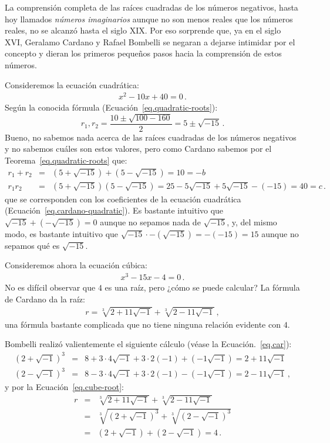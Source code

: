 La comprensión completa de las raíces cuadradas de los números negativos, hasta hoy llamados \emph{números imaginarios} aunque no son menos reales que los números reales, no se alcanzó hasta el siglo XIX. Por eso sorprende que, ya en el siglo XVI, Geralamo Cardano y Rafael Bombelli se negaran a dejarse intimidar por el concepto y dieran los primeros pequeños pasos hacia la comprensión de estos números.

Consideremos la ecuación cuadrática:
\begin{align}
x^2-10x+40=0\,.\label{eq.cardano-quadratic}
\end{align}
Según la conocida fórmula (Ecuación~\ref{eq.quadratic-roots}):
\[
r_1, r_2=\displaystyle\frac{10\pm\sqrt{100-160}}{2}=5\pm\sqrt{-15}\,.
\]
Bueno, no sabemos nada acerca de las raíces cuadradas de los números negativos y no sabemos cuáles son estos valores, pero como Cardano sabemos por el Teorema~\ref{eq.quadratic-roots} que:
\[
\begin{array}{lcl}
r_1+r_2&=&(5+\sqrt{-15})+(5-\sqrt{-15})=10=-b\\
r_1r_2&=&(5+\sqrt{-15})(5-\sqrt{-15})=25-5\sqrt{-15}+5\sqrt{-15}-(-15)=40=c\,.
\end{array}
\]
que se corresponden con los coeficientes de la ecuación cuadrática (Ecuación~\ref{eq.cardano-quadratic}). Es bastante intuitivo que $\sqrt{-15}+(-\sqrt{-15})=0$ aunque no sepamos nada de $\sqrt{-15}$, y, del mismo modo, es bastante intuitivo que $\sqrt{-15}\cdot-(\sqrt{-15})=-(-15)=15$ aunque no sepamos qué es $\sqrt{-15}$.

Consideremos ahora la ecuación cúbica:
\begin{align}
x^3-15x-4=0\,.\label{eq.bombelli-cubic}
\end{align}
No es difícil observar que $4$ es una raíz, pero ¿cómo se puede calcular? La fórmula de Cardano da la raíz:
\begin{align}
r=\sqrt[3]{2+11\sqrt{-1}}+\sqrt[3]{2-11\sqrt{-1}}\,,\label{eq.cube-root}
\end{align}
una fórmula bastante complicada que no tiene ninguna relación evidente con $4$. 

Bombelli realizó valientemente el siguiente cálculo (véase la Ecuación.~\ref{eq.car}):
\begin{eqnarray*}
(2+\sqrt{-1})^3&=&
8+3\cdot 4\sqrt{-1}+3\cdot 2(-1)+(-1\sqrt{-1})=
2+11\sqrt{-1}\\
(2-\sqrt{-1})^3&=&
8-3\cdot 4\sqrt{-1}+3\cdot 2(-1)-(-1\sqrt{-1})=
2-11\sqrt{-1}\,,
\end{eqnarray*}
y por la Ecuación~\ref{eq.cube-root}:
\begin{eqnarray*}
r&=&\sqrt[3]{2+11\sqrt{-1}} + \sqrt[3]{2-11\sqrt{-1}}\\
&=&\sqrt[3]{(2+\sqrt{-1})^3} + \sqrt[3]{(2-\sqrt{-1})^3}\\
&=&(2+\sqrt{-1}) + (2-\sqrt{-1})=4\,.
\end{eqnarray*}

